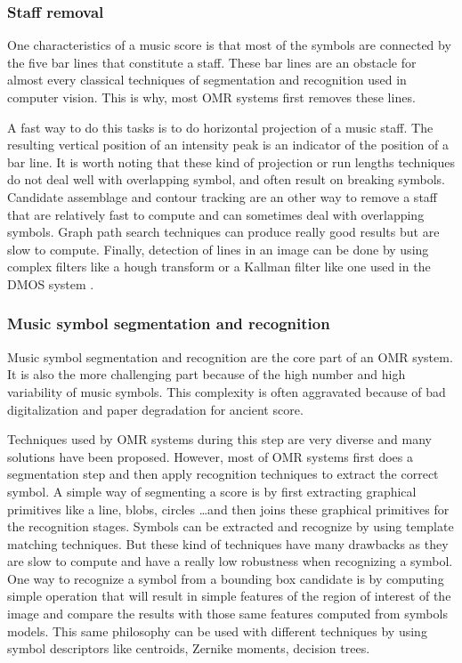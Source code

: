 \documentclass[11pt]{sdm}
\begin{document}
\subsubsection{Staff removal}

One characteristics of a music score is that most of the symbols are connected by the five bar lines that constitute a staff.
These bar lines are an obstacle for almost every classical techniques of segmentation and recognition used in computer vision.
This is why, most OMR systems first removes these lines.

A fast way to do this tasks is to do horizontal projection of a music staff.
The resulting vertical position of an intensity peak is an indicator of the position of a bar line.
It is worth noting that these kind of projection or run lengths techniques do not deal well with overlapping symbol, and often result on breaking symbols.
Candidate assemblage and contour tracking are an other way to remove a staff that are relatively fast to compute and can sometimes deal with overlapping symbols.
Graph path search techniques can produce really good results but are slow to compute.
Finally, detection of lines in an image can be done by using complex filters like a hough transform or a Kallman filter like one used in the DMOS system \cite{couasnon_dmos_2001}.



\subsubsection{Music symbol segmentation and recognition}


Music symbol segmentation and recognition are the core part of an OMR system.
It is also the more challenging part because of the high number and high variability of music symbols.
This complexity is often aggravated because of bad digitalization and paper degradation for ancient score.

Techniques used by OMR systems during this step are very diverse and many solutions have been proposed.
However, most of OMR systems first does a segmentation step and then apply recognition techniques to extract the correct symbol.
A simple way of segmenting a score is by first extracting graphical primitives like a line, blobs, circles \ldots and then joins these graphical primitives for the recognition stages.
Symbols can be extracted and recognize by using template matching techniques.
But these kind of techniques have many drawbacks as they are slow to compute and have a really low robustness when recognizing a symbol.
One way to recognize a symbol from a bounding box candidate is by computing simple operation that will result in simple features of the region of interest of the image and compare the results with those same features computed from symbols models.
This same philosophy can be used with different techniques by using symbol descriptors like centroids, Zernike moments, decision trees.
\end{document}
